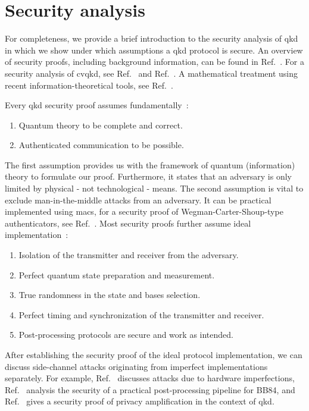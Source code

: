 \section{Security analysis}

For completeness, we provide a brief introduction to the security analysis of \gls{qkd} in which we show under which assumptions a \gls{qkd} protocol is secure.
An overview of security proofs, including background information, can be found in Ref.~\cite{Scarani2009}.
For a security analysis of \gls{cvqkd}, see Ref.~\cite{Diamanti2015} and Ref.~\cite{Laudenbach2018}. 
A mathematical treatment using recent information-theoretical tools, see Ref.~\cite{Wolf2021}.

Every \gls{qkd} security proof assumes fundamentally~\cite[p.~10]{Scarani2009}:
\begin{enumerate}
	\item Quantum theory to be complete and correct.
	\item Authenticated communication to be possible.
\end{enumerate}
The first assumption provides us with the framework of quantum (information) theory to formulate our proof.
Furthermore, it states that an adversary is only limited by physical - not technological - means.
The second assumption is vital to exclude man-in-the-middle attacks from an adversary.
It can be practical implemented using \gls{mac}s, for a security proof of Wegman-Carter-Shoup-type authenticators, see Ref.~\cite{Bernstein2005}.
Most security proofs further assume ideal implementation~\cite[p.~124]{Wolf2021}:
\begin{enumerate}
	\item Isolation of the transmitter and receiver from the adversary.
	\item Perfect quantum state preparation and measurement.
	\item True randomness in the state and bases selection.
	\item Perfect timing and synchronization of the transmitter and receiver.
	\item Post-processing protocols are secure and work as intended.
\end{enumerate}
After establishing the security proof of the ideal protocol implementation, we can discuss side-channel attacks originating from imperfect implementations separately.
For example, Ref.~\cite[p.~8]{Lo2014} discusses attacks due to hardware imperfections, Ref.~\cite{Fung2010} analysis the security of a practical post-processing pipeline for BB84, and Ref.~\cite{Renner2005} gives a security proof of privacy amplification in the context of \gls{qkd}.

